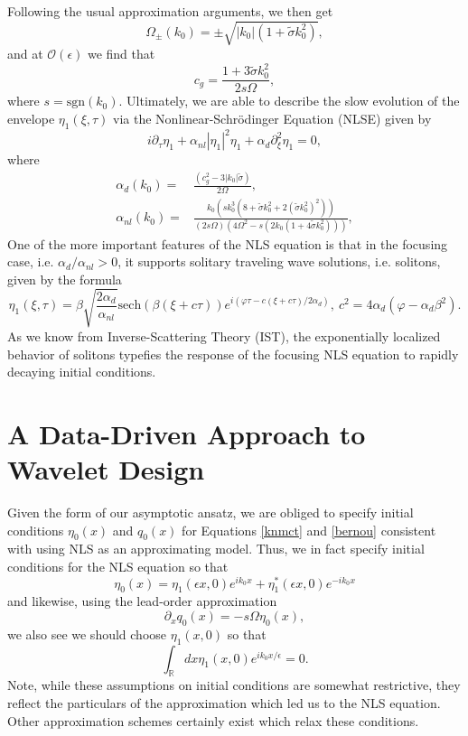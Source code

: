 \documentclass[a4paper,11pt]{article}
\newcommand{\p}{\partial}
\newcommand{\sech}{\mbox{sech}}
\begin{document}
Following the usual approximation arguments, we then get 
\begin{equation*}
\Omega_{\pm}(k_{0})  = \pm \sqrt{|k_{0}|(1+\tilde{\sigma}k_{0}^{2})},
\end{equation*}
and at $\mathcal{O}(\epsilon)$ we find that
\[
c_{g} = \frac{1+3\tilde{\sigma}k_{0}^{2}}{2s\Omega},
\]
where $s=\mbox{sgn}(k_{0})$.  Ultimately, we are able to describe the slow evolution of the envelope $\eta_{1}(\xi,\tau)$ via the Nonlinear-Schr\"{o}dinger Equation (NLSE) given by 
\begin{equation*}
i\p_{\tau}\eta_{1} + \alpha_{nl}\left|\eta_{1}\right|^{2}\eta_{1} + \alpha_{d}\p_{\xi}^{2}\eta_{1} = 0,
\end{equation*}
where
\begin{align*}
\alpha_{d}(k_{0}) = & \frac{(c^2_{g} - 3|k_{0}|\tilde{\sigma})}{2\Omega},\\
\alpha_{nl}(k_{0}) = & \frac{k_{0}\left( sk_{0}^{3}\left(8 + \tilde{\sigma}k_{0}^{2} + 2(\tilde{\sigma}k_{0}^{2})^{2}\right)  \right)}{\left(2s\Omega \right) \left(4\Omega^2-s(2k_{0}(1+4\tilde{\sigma}k_{0}^{2}) )\right)},
\end{align*}
One of the more important features of the NLS equation is that in the focusing case, i.e. $\alpha_{d}/\alpha_{nl}>0$, it supports solitary traveling wave solutions, i.e. solitons, given by the formula
\[
\eta_{1}(\xi,\tau) = \beta \sqrt{\frac{2\alpha_{d}}{\alpha_{nl}}}\sech\left(\beta\left(\xi + c\tau \right)\right) e^{i\left(\varphi \tau - c(\xi+c\tau)/2\alpha_{d}\right)}, ~ c^{2} = 4\alpha_{d}(\varphi - \alpha_{d}\beta^{2}).
\]
As we know from Inverse-Scattering Theory (IST), the exponentially localized behavior of solitons typefies the response of the focusing NLS equation to rapidly decaying initial conditions. 

\section*{A Data-Driven Approach to Wavelet Design}

Given the form of our asymptotic ansatz, we are obliged to specify initial conditions $\eta_{0}(x)$ and $q_{0}(x)$ for Equations \eqref{knmct} and \eqref{bernou} consistent with using NLS as an approximating model.  Thus, we in fact specify initial conditions for the NLS equation so that 
\[
\eta_{0}(x) = \eta_{1}(\epsilon x,0)e^{ik_{0}x} +  \eta_{1}^{\ast}(\epsilon x,0)e^{-ik_{0}x}
\]
and likewise, using the lead-order approximation
\[
\p_{x}q_{0}(x) = -s\Omega \eta_{0}(x),
\]
we also see we should choose $\eta_{1}(x,0)$ so that 
\[
\int_{\mathbb{R}}dx \eta_{1}(x,0)e^{ik_{0}x/\epsilon} = 0.
\]
Note, while these assumptions on initial conditions are somewhat restrictive, they reflect the particulars of the approximation which led us to the NLS equation.  Other approximation schemes certainly exist which relax these conditions.  
\end{document}
